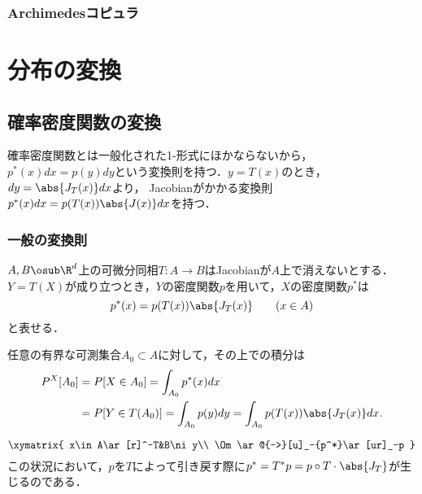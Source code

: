 \documentclass[uplatex,dvipdfmx]{jsreport}
\begin{document}
\subsection{Archimedesコピュラ}

\chapter{分布の変換}

\section{確率密度関数の変換}

\begin{tcolorbox}[colframe=ForestGreen, colback=ForestGreen!10!white,breakable,colbacktitle=ForestGreen!40!white,coltitle=black,fonttitle=\bfseries\sffamily,
title=]
    確率密度関数とは一般化された1-形式にほかならないから，
    $p^*(x)dx=p(y)dy$という変換則を持つ．$y=T(x)$のとき，$dy=\abs{J_T(x)}dx$より，
    Jacobianがかかる変換則$p^*(x)dx=p(T(x))\abs{J(x)}dx$を持つ．
\end{tcolorbox}

\subsection{一般の変換則}

\begin{proposition}[変数変換による密度関数の変換則]
    $A,B\osub\R^d$上の可微分同相$T:A\to B$はJacobianが$A$上で消えないとする．
    $Y=T(X)$が成り立つとき，$Y$の密度関数$p$を用いて，$X$の密度関数$p^*$は
    \[p^*(x)=p(T(x))\abs{J_T(x)}\qquad(x\in A)\]
    と表せる．
\end{proposition}
\begin{Proof}
    任意の有界な可測集合$A_0\subset A$に対して，その上での積分は
    \begin{align*}
        P^X[A_0]&=P[X\in A_0]=\int_{A_0}p^*(x)dx\\
        &=P[Y\in T(A_0)]=\int_{A_0}p(y)dy=\int_{A_0}p(T(x))\abs{J_T(x)}dx.
    \end{align*}
\end{Proof}
\begin{remarks}[変換の方向]
    \[\xymatrix{
        x\in A\ar[r]^-T&B\ni y\\
        \Om\ar@{-->}[u]_-{p^*}\ar[ur]_-p
    }\]
    この状況において，$p$を$T$によって引き戻す際に$p^*=T^*p=p\circ T\cdot \abs{J_T}$が生じるのである．
\end{remarks}
\end{document}
